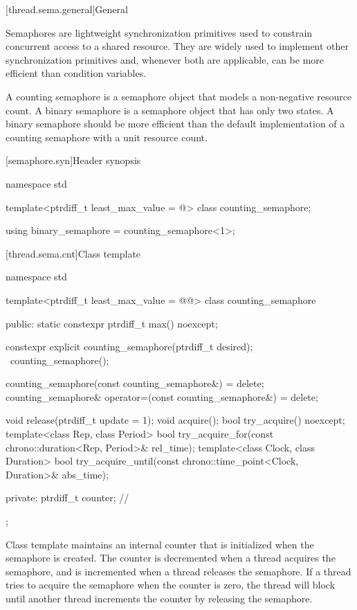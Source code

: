 [thread.sema.general]{General}

\pnum
Semaphores are lightweight synchronization primitives
used to constrain concurrent access to a shared resource.
They are widely used to implement other synchronization primitives and,
whenever both are applicable, can be more efficient than condition variables.

\pnum
A counting semaphore is a semaphore object
that models a non-negative resource count.
A binary semaphore is a semaphore object that has only two states.
A binary semaphore should be more efficient than
the default implementation of a counting semaphore with a unit resource count.

[semaphore.syn]{Header  synopsis}

%
\begin{codeblock}
namespace std {
  template<ptrdiff_t least_max_value = @\impdef@>
    class counting_semaphore;

  using binary_semaphore = counting_semaphore<1>;
}
\end{codeblock}

[thread.sema.cnt]{Class template }

\begin{codeblock}
namespace std {
  template<ptrdiff_t least_max_value = @@>
  class counting_semaphore {
  public:
    static constexpr ptrdiff_t max() noexcept;

    constexpr explicit counting_semaphore(ptrdiff_t desired);
    ~counting_semaphore();

    counting_semaphore(const counting_semaphore&) = delete;
    counting_semaphore& operator=(const counting_semaphore&) = delete;

    void release(ptrdiff_t update = 1);
    void acquire();
    bool try_acquire() noexcept;
    template<class Rep, class Period>
      bool try_acquire_for(const chrono::duration<Rep, Period>& rel_time);
    template<class Clock, class Duration>
      bool try_acquire_until(const chrono::time_point<Clock, Duration>& abs_time);

  private:
    ptrdiff_t counter;          // \expos
  };
}
\end{codeblock}

\pnum
{}%
Class template  maintains an internal counter
that is initialized when the semaphore is created.
The counter is decremented when a thread acquires the semaphore, and
is incremented when a thread releases the semaphore.
If a thread tries to acquire the semaphore when the counter is zero,
the thread will block
until another thread increments the counter by releasing the semaphore.

